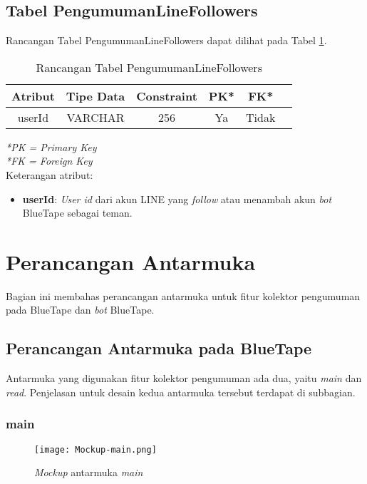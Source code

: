 \subsection{Tabel PengumumanLineFollowers}
Rancangan Tabel PengumumanLineFollowers dapat dilihat pada Tabel \ref{table:rancangan-tabel-PengumumanLineFollowers}.
\begin{table}[H]
	\caption{Rancangan Tabel PengumumanLineFollowers}
	\label{table:rancangan-tabel-PengumumanLineFollowers}
	\centering
	\begin{tabular}{|c|c|c|c|c|c|}
 			\hline
			\textbf{Atribut} & \textbf{Tipe Data} & \textbf{Constraint} & \textbf{PK*}  & \textbf{FK*} \\
			\hline
			 userId & VARCHAR & 256 & Ya & Tidak\\
            \hline
	\end{tabular}
\end{table}
\noindent \textit{*PK = Primary Key} \\
\textit{*FK = Foreign Key} \\

Keterangan atribut:
\begin{itemize}
\item \textbf{userId}: \textit{User id} dari akun LINE yang \textit{follow} atau menambah akun \textit{bot} BlueTape sebagai teman.
\end{itemize}

\section{Perancangan Antarmuka}
	Bagian ini membahas perancangan antarmuka untuk fitur kolektor pengumuman pada BlueTape dan \textit{bot} BlueTape.
\subsection{Perancangan Antarmuka pada BlueTape}
Antarmuka yang digunakan fitur kolektor pengumuman ada dua, yaitu \textit{main} dan \textit{read}. Penjelasan untuk desain kedua antarmuka tersebut terdapat di subbagian.

\subsubsection{main}

\begin{figure}[H]
	\centering  
	\texttt{[image: Mockup-main.png]}  
	\caption[\textit{Mockup} antarmuka \textit{main}]{\textit{Mockup} antarmuka \textit{main}} 
	\label{fig:mockup-main} 
\end{figure}


